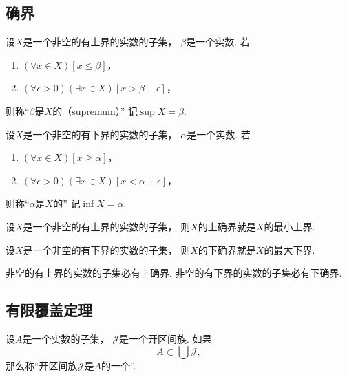 \subsection{确界}
\begin{definition}
设\(X\)是一个非空的有上界的实数的子集，
\(\beta\)是一个实数.
若\begin{enumerate}
	\item \((\forall x \in X)[x \leq \beta]\)，
	\item \((\forall \epsilon>0)(\exists x \in X)[x>\beta-\epsilon]\)，
\end{enumerate}
则称“\(\beta\)是\(X\)的（supremum）”
记\(\sup X = \beta\).
\end{definition}

\begin{definition}
设\(X\)是一个非空的有下界的实数的子集，
\(\alpha\)是一个实数.
若\begin{enumerate}
	\item \((\forall x \in X)[x \geq \alpha]\)，
	\item \((\forall \epsilon>0)(\exists x \in X)[x<\alpha+\epsilon]\)，
\end{enumerate}
则称“\(\alpha\)是\(X\)的”
记\(\inf X = \alpha\).
\end{definition}

\begin{proposition}
设\(X\)是一个非空的有上界的实数的子集，
则\(X\)的上确界就是\(X\)的最小上界.
\end{proposition}

\begin{proposition}
设\(X\)是一个非空的有下界的实数的子集，
则\(X\)的下确界就是\(X\)的最大下界.
\end{proposition}


\begin{theorem}[确界原理]
非空的有上界的实数的子集必有上确界.
非空的有下界的实数的子集必有下确界.
\end{theorem}

\subsection{有限覆盖定理}
\begingroup
\def\J{\mathscr{J}}%
\begin{definition}
设\(A\)是一个实数的子集，
\(\J\)是一个开区间族.
如果\[
	A \subset \bigcup \J,
\]
那么称“开区间族\(\J\)是\(A\)的一个”.
\end{definition}

